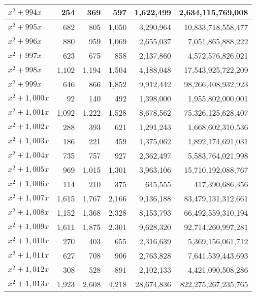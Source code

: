 \documentclass[a4paper]{amsproc}
\theoremstyle{plain}
\theoremstyle{named}
\begin{document}
\begin{longtable}{ | l | r | r | r | r | r | }
$x^2 + 994x$ & 254 & 369 & 597 & 1{,}622{,}499 & 2{,}634{,}115{,}769{,}008 \\ \hline
$x^2 + 995x$ & 682 & 805 & 1{,}050 & 3{,}290{,}964 & 10{,}833{,}718{,}558{,}477 \\ \hline
$x^2 + 996x$ & 880 & 959 & 1{,}069 & 2{,}655{,}037 & 7{,}051{,}865{,}888{,}222 \\ \hline
$x^2 + 997x$ & 623 & 675 & 858 & 2{,}137{,}860 & 4{,}572{,}576{,}826{,}021 \\ \hline
$x^2 + 998x$ & 1{,}102 & 1{,}194 & 1{,}504 & 4{,}188{,}048 & 17{,}543{,}925{,}722{,}209 \\ \hline
$x^2 + 999x$ & 646 & 866 & 1{,}852 & 9{,}912{,}442 & 98{,}266{,}408{,}932{,}923 \\ \hline
$x^2 + 1{,}000x$ & 92 & 140 & 492 & 1{,}398{,}000 & 1{,}955{,}802{,}000{,}001 \\ \hline
$x^2 + 1{,}001x$ & 1{,}092 & 1{,}222 & 1{,}528 & 8{,}678{,}562 & 75{,}326{,}125{,}628{,}407 \\ \hline
$x^2 + 1{,}002x$ & 288 & 393 & 621 & 1{,}291{,}243 & 1{,}668{,}602{,}310{,}536 \\ \hline
$x^2 + 1{,}003x$ & 186 & 221 & 459 & 1{,}375{,}062 & 1{,}892{,}174{,}691{,}031 \\ \hline
$x^2 + 1{,}004x$ & 735 & 757 & 927 & 2{,}362{,}497 & 5{,}583{,}764{,}021{,}998 \\ \hline
$x^2 + 1{,}005x$ & 969 & 1{,}015 & 1{,}301 & 3{,}963{,}106 & 15{,}710{,}192{,}088{,}767 \\ \hline
$x^2 + 1{,}006x$ & 114 & 210 & 375 & 645{,}555 & 417{,}390{,}686{,}356 \\ \hline
$x^2 + 1{,}007x$ & 1{,}615 & 1{,}767 & 2{,}166 & 9{,}136{,}188 & 83{,}479{,}131{,}312{,}661 \\ \hline
$x^2 + 1{,}008x$ & 1{,}152 & 1{,}368 & 2{,}328 & 8{,}153{,}793 & 66{,}492{,}559{,}310{,}194 \\ \hline
$x^2 + 1{,}009x$ & 1{,}611 & 1{,}875 & 2{,}301 & 9{,}628{,}320 & 92{,}714{,}260{,}997{,}281 \\ \hline
$x^2 + 1{,}010x$ & 270 & 403 & 655 & 2{,}316{,}639 & 5{,}369{,}156{,}061{,}712 \\ \hline
$x^2 + 1{,}011x$ & 627 & 708 & 906 & 2{,}763{,}828 & 7{,}641{,}539{,}443{,}693 \\ \hline
$x^2 + 1{,}012x$ & 308 & 528 & 891 & 2{,}102{,}133 & 4{,}421{,}090{,}508{,}286 \\ \hline
$x^2 + 1{,}013x$ & 1{,}923 & 2{,}608 & 4{,}218 & 28{,}674{,}836 & 822{,}275{,}267{,}235{,}765 \\ \hline

\end{longtable}
\end{document}
